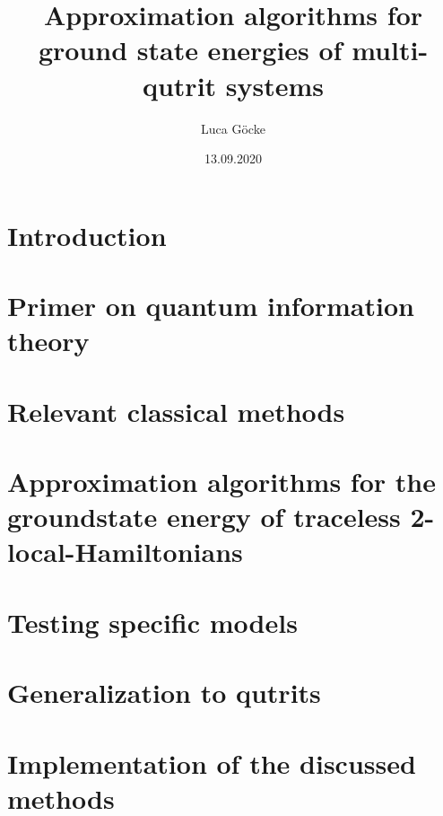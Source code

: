 \documentclass[pstricks,siunitx,theorem,british]{tumphthesis}
\title{Approximation algorithms for ground state energies of multi-qutrit systems}
\author{Luca Göcke}
\date{13.09.2020}
\begin{document}
\frontmatter
\maketitle
\tableofcontents
\mainmatter
\chapter{Introduction}

\chapter{Primer on quantum information theory}

\chapter{Relevant classical methods}

\chapter{Approximation algorithms for the groundstate energy of traceless 2-local-Hamiltonians}

\chapter{Testing specific models}

\chapter{Generalization to qutrits}

\appendix
\chapter{Implementation of the discussed methods}

\backmatter
\printbibliography
\end{document}
